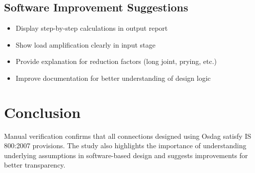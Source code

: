 \documentclass[12pt]{report}
\begin{document}
\section{Software Improvement Suggestions}
\begin{itemize}
\item Display step-by-step calculations in output report
\item Show load amplification clearly in input stage
\item Provide explanation for reduction factors (long joint, prying, etc.)
\item Improve documentation for better understanding of design logic
\end{itemize}

\chapter{Conclusion}

Manual verification confirms that all connections designed using Osdag satisfy IS 800:2007 provisions. The study also highlights the importance of understanding underlying assumptions in software-based design and suggests improvements for better transparency.
\end{document}
